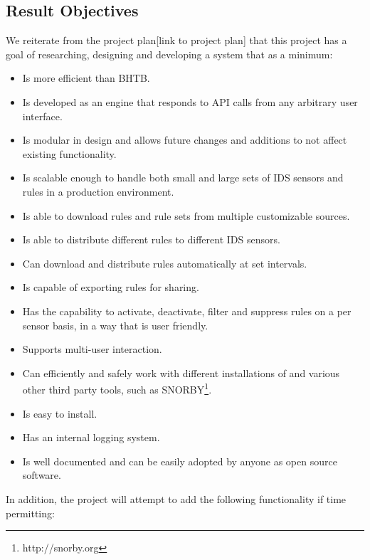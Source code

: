 \subsection{Result Objectives}
We reiterate from the project plan[link to project plan] that this
project has a goal of researching, designing and developing a system that
as a minimum:
\begin{itemize}
\item Is more efficient than BHTB.
\item Is developed as an engine that responds to API calls from any arbitrary
user interface.
\item Is modular in design and allows future changes and additions to not affect
existing functionality.
\item Is scalable enough to handle both small and large sets of IDS sensors and
rules in a production environment.
\item Is able to download rules and rule sets from multiple customizable sources.
\item Is able to distribute different rules to different IDS sensors.
\item Can download and distribute rules automatically at set intervals.
\item Is capable of exporting rules for sharing.
\item Has the capability to activate, deactivate, filter and suppress rules on a
per sensor basis, in a way that is user friendly.
\item Supports multi-user interaction.
\item Can efficiently and safely work with different installations of \snort{} and various
other third party tools, such as SNORBY\footnote{http://snorby.org}.
\item Is easy to install.
\item Has an internal logging system.
\item Is well documented and can be easily adopted by anyone as open source software.
\end{itemize}
In addition, the project will attempt to add the following functionality if
time permitting:
